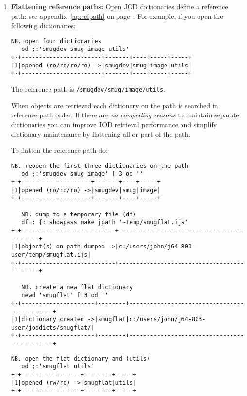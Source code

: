 \begin{enumerate}

\item \textbf{Flattening reference paths:} Open JOD dictionaries define a reference path: see appendix~\ref{ap:refpath} on page~\pageref{ap:refpath}.
For example, if you open the following dictionaries:

\begin{lstlisting}[frame=single,framerule=0pt,basicstyle=\ttfamily\footnotesize]
   NB. open four dictionaries
   od ;:'smugdev smug image utils'
+-+-----------------------+-------+----+-----+-----+
|1|opened (ro/ro/ro/ro) ->|smugdev|smug|image|utils|
+-+-----------------------+-------+----+-----+-----+
\end{lstlisting}

The reference path is \texttt{/smugdev/smug/image/utils}.

When objects are retrieved each dictionary on the path is searched in reference path order.
If there are \emph{no compelling reasons} to maintain separate dictionaries you can improve
JOD retrieval performance and simplify dictionary maintenance by flattening all or part of the path. 

To flatten the reference path do:

\begin{lstlisting}[frame=single,framerule=0pt,basicstyle=\ttfamily\footnotesize]
   NB. reopen the first three dictionaries on the path
   od ;:'smugdev smug image' [ 3 od ''
+-+--------------------+-------+----+-----+
|1|opened (ro/ro/ro) ->|smugdev|smug|image|
+-+--------------------+-------+----+-----+

   NB. dump to a temporary file (df)
   df=: {: showpass make jpath '~temp/smugflat.ijs'
+-+---------------------------+--------------------------------------------+
|1|object(s) on path dumped ->|c:/users/john/j64-803-user/temp/smugflat.ijs|
+-+---------------------------+--------------------------------------------+

   NB. create a new flat dictionary
   newd 'smugflat' [ 3 od ''
+-+---------------------+--------+---------------------------------------------+
|1|dictionary created ->|smugflat|c:/users/john/j64-803-user/joddicts/smugflat/|
+-+---------------------+--------+---------------------------------------------+
\end{lstlisting}

\newpage

\begin{lstlisting}[frame=single,framerule=0pt,basicstyle=\ttfamily\footnotesize]
   NB. open the flat dictionary and (utils)
   od ;:'smugflat utils'
+-+-----------------+--------+-----+
|1|opened (rw/ro) ->|smugflat|utils|
+-+-----------------+--------+-----+
  

\end{lstlisting}
\end{enumerate}
